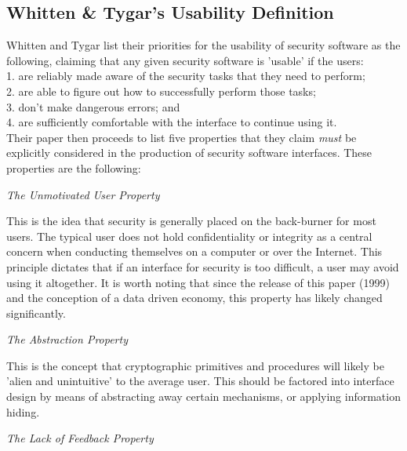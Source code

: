 \documentclass[journal]{IEEEtran}
\begin{document}
\subsection{Whitten \& Tygar's Usability Definition}
Whitten and Tygar list their priorities for the usability of security software as the following, claiming that any given security software is 'usable' if the users:\\
1. are reliably made aware of the security tasks that they need to perform;\\
2. are able to figure out how to successfully perform those tasks;\\
3. don't make dangerous errors; and\\
4. are sufficiently comfortable with the interface to continue using it.\\

Their paper then proceeds to list five properties that they claim \textit{must} be explicitly considered in the production of security software interfaces. These properties are the following:

\begin{center}\textit{The Unmotivated User Property}\\\end{center}

This is the idea that security is generally placed on the back-burner for most users. The typical user does not hold confidentiality or integrity as a central concern when conducting themselves on a computer or over the Internet. This principle dictates that if an interface for security is too difficult, a user may avoid using it altogether. It is worth noting that since the release of this paper (1999) and the conception of a data driven economy, this property has likely changed significantly.

\begin{center}\textit{The Abstraction Property}\\\end{center}

This is the concept that cryptographic primitives and procedures will likely be 'alien and unintuitive' to the average user. This should be factored into interface design by means of abstracting away certain mechanisms, or applying information hiding.

\begin{center}\textit{The Lack of Feedback Property}\\\end{center}
\end{document}
